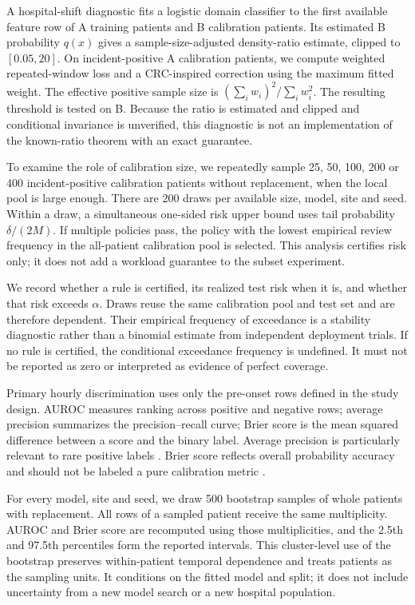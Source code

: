 A hospital-shift diagnostic fits a logistic domain classifier to the first available feature row of A training patients and B calibration patients. Its estimated B probability $q(x)$ gives a sample-size-adjusted density-ratio estimate, clipped to $[0.05,20]$. On incident-positive A calibration patients, we compute weighted repeated-window loss and a CRC-inspired correction using the maximum fitted weight. The effective positive sample size is $(\sum_i w_i)^2/\sum_i w_i^2$. The resulting threshold is tested on B. Because the ratio is estimated and clipped and conditional invariance is unverified, this diagnostic is not an implementation of the known-ratio theorem with an exact guarantee.

To examine the role of calibration size, we repeatedly sample 25, 50, 100, 200 or 400 incident-positive calibration patients without replacement, when the local pool is large enough. There are 200 draws per available size, model, site and seed. Within a draw, a simultaneous one-sided risk upper bound uses tail probability $\delta/(2M)$. If multiple policies pass, the policy with the lowest empirical review frequency in the all-patient calibration pool is selected. This analysis certifies risk only; it does not add a workload guarantee to the subset experiment.

We record whether a rule is certified, its realized test risk when it is, and whether that risk exceeds $\alpha$. Draws reuse the same calibration pool and test set and are therefore dependent. Their empirical frequency of exceedance is a stability diagnostic rather than a binomial estimate from independent deployment trials. If no rule is certified, the conditional exceedance frequency is undefined. It must not be reported as zero or interpreted as evidence of perfect coverage.

Primary hourly discrimination uses only the pre-onset rows defined in the study design. AUROC measures ranking across positive and negative rows; average precision summarizes the precision--recall curve; Brier score is the mean squared difference between a score and the binary label. Average precision is particularly relevant to rare positive labels \citep{saito2015}. Brier score reflects overall probability accuracy and should not be labeled a pure calibration metric \citep{vancalster2019}.

For every model, site and seed, we draw 500 bootstrap samples of whole patients with replacement. All rows of a sampled patient receive the same multiplicity. AUROC and Brier score are recomputed using those multiplicities, and the 2.5th and 97.5th percentiles form the reported intervals. This cluster-level use of the bootstrap \citep{efron1979} preserves within-patient temporal dependence and treats patients as the sampling units. It conditions on the fitted model and split; it does not include uncertainty from a new model search or a new hospital population.

